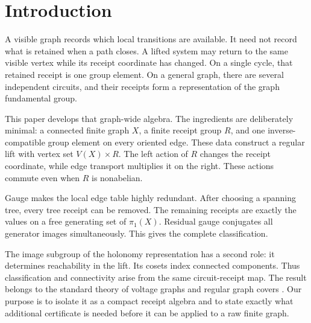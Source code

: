 \section{Introduction}

A visible graph records which local transitions are available. It need not
record what is retained when a path closes. A lifted system may return to the
same visible vertex while its receipt coordinate has changed. On a single
cycle, that retained receipt is one group element. On a general graph, there
are several independent circuits, and their receipts form a representation of
the graph fundamental group.

This paper develops that graph-wide algebra. The ingredients are deliberately
minimal: a connected finite graph $X$, a finite receipt group $R$, and one
inverse-compatible group element on every oriented edge. These data construct
a regular lift with vertex set $V(X)\times R$. The left action of $R$ changes
the receipt coordinate, while edge transport multiplies it on the right.
These actions commute even when $R$ is nonabelian.

Gauge makes the local edge table highly redundant. After choosing a spanning
tree, every tree receipt can be removed. The remaining receipts are exactly
the values on a free generating set of $\pi_1(X)$. Residual gauge conjugates
all generator images simultaneously. This gives the complete classification.

The image subgroup of the holonomy representation has a second role: it
determines reachability in the lift. Its cosets index connected components.
Thus classification and connectivity arise from the same circuit-receipt map.
The result belongs to the standard theory of voltage graphs and regular graph
covers \cite{gross-tucker}. Our purpose is to isolate it as a compact receipt
algebra and to state exactly what additional certificate is needed before it
can be applied to a raw finite graph.
